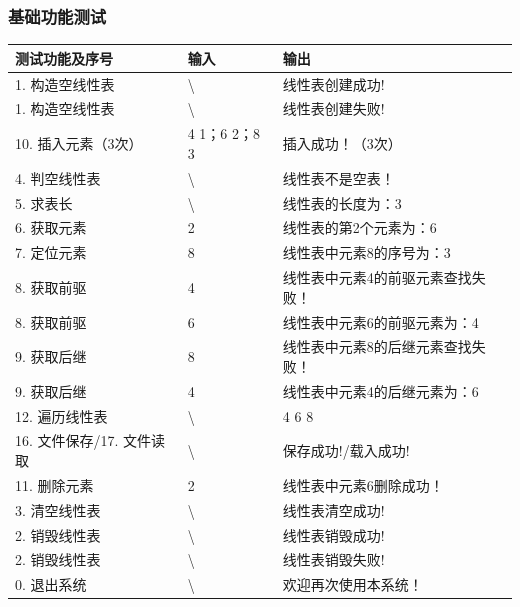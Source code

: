 \documentclass[supercite]{Experimental_Report}
\theoremstyle{definition}
\begin{document}
\newpage

\subsubsection{基础功能测试}
    \begin{center}
        \setlength{\tabcolsep}{2.0mm}
        \label{table:seqlist-test}
        \begin{tabularx}{\textwidth}{|X|X|X|}
            \hline
            测试功能及序号 & 输入 & 输出 \\\hline
            1. 构造空线性表 & \textbackslash & 线性表创建成功! \\\hline
            1. 构造空线性表 & \textbackslash & 线性表创建失败! \\\hline
            10. 插入元素（3次） & 4 1；6 2；8 3 & 插入成功！（3次） \\\hline
            4. 判空线性表 & \textbackslash & 线性表不是空表！ \\\hline
            5. 求表长 & \textbackslash & 线性表的长度为：3 \\\hline
            6. 获取元素 & 2 & 线性表的第2个元素为：6 \\\hline
            7. 定位元素 & 8 & 线性表中元素8的序号为：3 \\\hline
            8. 获取前驱 & 4 & 线性表中元素4的前驱元素查找失败！ \\\hline
            8. 获取前驱 & 6 & 线性表中元素6的前驱元素为：4 \\\hline
            9. 获取后继 & 8 & 线性表中元素8的后继元素查找失败！ \\\hline
            9. 获取后继 & 4 & 线性表中元素4的后继元素为：6 \\\hline
            12. 遍历线性表 & \textbackslash & 4 6 8 \\\hline
            16. 文件保存/17. 文件读取 & \textbackslash & 保存成功!/载入成功! \\\hline
            11. 删除元素 & 2 & 线性表中元素6删除成功！ \\\hline
            3. 清空线性表 & \textbackslash & 线性表清空成功! \\\hline
            2. 销毁线性表 & \textbackslash & 线性表销毁成功! \\\hline
            2. 销毁线性表 & \textbackslash & 线性表销毁失败! \\\hline
            0. 退出系统 & \textbackslash & 欢迎再次使用本系统！ \\\hline
        \end{tabularx}
    \end{center}
\end{document}
